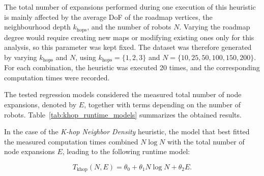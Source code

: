 The total number of expansions performed during one execution of this heuristic is mainly affected
by the average DoF of the roadmap vertices, the neighbourhood depth \(k_{\text{hops}}\), and the
number of robots \(N\). Varying the roadmap degree would require creating new maps or modifying
existing ones only for this analysis, so this parameter was kept fixed. The dataset was therefore
generated by varying \(k_{\text{hops}}\) and \(N\), using
\(k_{\text{hops}}=\{1,2,3\}\) and \(N=\{10,25,50,100,150,200\}\). For each combination, the
heuristic was executed 20 times, and the corresponding computation times were recorded.

The tested regression models considered the measured total number of node expansions, denoted
by \(E\), together with terms depending on the number of robots. Table~\ref{tab:khop_runtime_models}
summarizes the obtained results.

\begin{table}[H]
\centering
\caption{Regression models tested for estimating the computation time of the \textit{K-hop Neighbor Density} heuristic.}
\label{tab:khop_runtime_models}
\small
{}
\end{table}

In the case of the \textit{K-hop Neighbor Density} heuristic, the model that best fitted the measured
computation times combined \(N\log N\) with the total number of node expansions \(E\), leading
to the following runtime model:

\begin{equation}
    T_{\mathrm{khop}}(N,E)
    =
    \theta_0 + \theta_1N\log N + \theta_2E .
    \label{eq:khop_runtime_model}
\end{equation}

